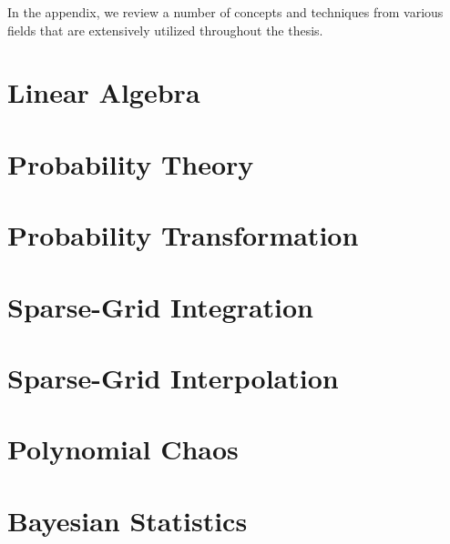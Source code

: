 In the appendix, we review a number of concepts and techniques from various
fields that are extensively utilized throughout the thesis.

\section{Linear Algebra}

\section{Probability Theory}

\section{Probability Transformation}

\section{Sparse-Grid Integration}

\section{Sparse-Grid Interpolation}

\section{Polynomial Chaos}

\section{Bayesian Statistics}
